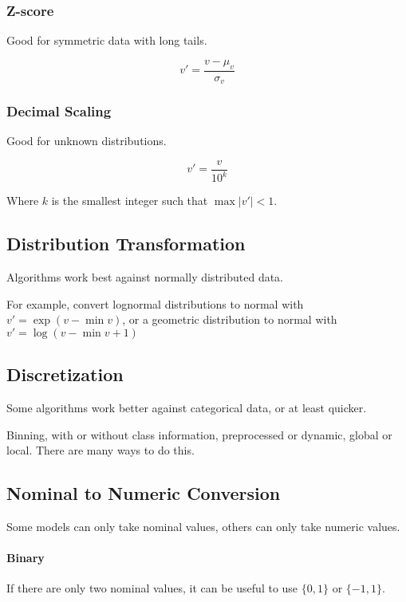 \documentclass{idc_msc}
\begin{document}
\subsubsection{Z-score}

Good for symmetric data with long tails.

\[v' = \frac{v - \mu_v}{\sigma_v}\]

\subsubsection{Decimal Scaling}

Good for unknown distributions.

\[v' = \frac{v}{10^k}\]

Where \(k\) is the smallest integer such that \(\max|v'| < 1\).

\subsection{Distribution Transformation}

Algorithms work best against normally distributed data.

For example, convert lognormal distributions to normal with \(v' = \exp(v - \min v)\), or a geometric distribution to normal with \(v' = \log (v - \min v + 1)\)

\subsection{Discretization}

Some algorithms work better against categorical data, or at least quicker.

Binning, with or without class information, preprocessed or dynamic, global or local. There are many ways to do this.

\subsection{Nominal to Numeric Conversion}

Some models can only take nominal values, others can only take numeric values.

\paragraph{Binary}

If there are only two nominal values, it can be useful to use \(\{0,1\}\) or \(\{-1,1\}\).
\end{document}
